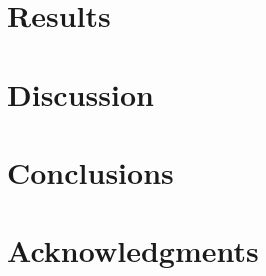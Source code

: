 \documentclass[]{sig-alternate}
\begin{document}
\section{Results}\label{sec:results}

\section{Discussion}\label{sec:discussion} 

\section{Conclusions}\label{sec:conclusions}
  

\section{Acknowledgments}



\end{document}

